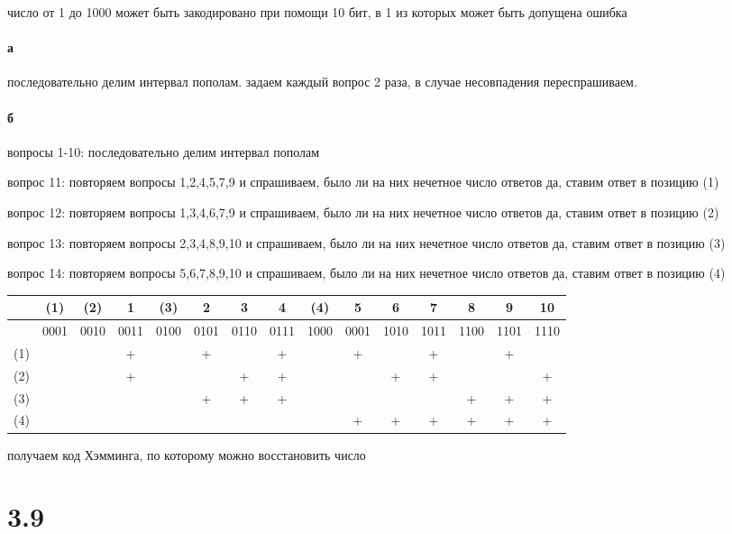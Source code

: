 \documentclass[russian]{article}
\begin{document}
число от 1 до 1000 может быть закодировано при помощи 10 бит, в 1 из которых может быть допущена ошибка

\paragraph{а}
последовательно делим интервал пополам. задаем каждый вопрос 2 раза, в случае несовпадения переспрашиваем.

\paragraph{б}

вопросы 1-10: последовательно делим интервал пополам

вопрос 11: повторяем вопросы 1,2,4,5,7,9 и спрашиваем, было ли на них нечетное число ответов да, ставим ответ в позицию (1)

вопрос 12: повторяем вопросы 1,3,4,6,7,9 и спрашиваем, было ли на них нечетное число ответов да, ставим ответ в позицию (2)

вопрос 13: повторяем вопросы 2,3,4,8,9,10 и спрашиваем, было ли на них нечетное число ответов да, ставим ответ в позицию (3)

вопрос 14: повторяем вопросы 5,6,7,8,9,10 и спрашиваем, было ли на них нечетное число ответов да, ставим ответ в позицию (4)

{
\tiny
\begin{tabular}{|c|c|c|c|c|c|c|c|c|c|c|c|c|c|c|} \hline
& (1) & (2) & 1 & (3) & 2 & 3 & 4 & (4) & 5 & 6 & 7 & 8 & 9 & 10 \\\hline
& 0001 & 0010 & 0011 & 0100 & 0101 & 0110 & 0111 & 1000 & 0001 & 1010 & 1011 & 1100 & 1101 & 1110 \\\hline
(1) & & & + & & + &   & + & & + &   & + &   & + &   \\\hline
(2) & & & + & &   & + & + & &   & + & + &   &   & + \\\hline
(3) & & &   & & + & + & + & &   &   &   & + & + & + \\\hline
(4) & & &   & &   &   &   & & + & + & + & + & + & + \\\hline
\end{tabular}
}

получаем код Хэмминга, по которому можно восстановить число

\section*{3.9}
\end{document}
